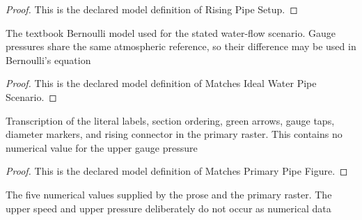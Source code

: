 \begin{proof}
  This is the declared model definition of Rising Pipe Setup.
\end{proof}
\begin{definition}
  \label{def:physics:phyx-mini-0724:phyxminiproblems-problemphyxmini0724-matchesidealwaterpipescenario}
  The textbook Bernoulli model used for the stated water-flow scenario. Gauge pressures share the same atmospheric reference, so their difference may be used in Bernoulli's equation
\end{definition}
\begin{proof}
  This is the declared model definition of Matches Ideal Water Pipe Scenario.
\end{proof}
\begin{definition}
  \label{def:physics:phyx-mini-0724:phyxminiproblems-problemphyxmini0724-matchesprimarypipefigure}
  Transcription of the literal labels, section ordering, green arrows, gauge taps, diameter markers, and rising connector in the primary raster. This contains no numerical value for the upper gauge pressure
\end{definition}
\begin{proof}
  This is the declared model definition of Matches Primary Pipe Figure.
\end{proof}
\begin{definition}
  \label{def:physics:phyx-mini-0724:phyxminiproblems-problemphyxmini0724-matchesproblemreadouts}
  The five numerical values supplied by the prose and the primary raster. The upper speed and upper pressure deliberately do not occur as numerical data
\end{definition}
